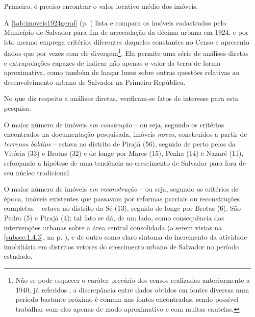 Primeiro, é preciso encontrar o valor locativo médio dos imóveis. 

A \autoref{tab:imoveis1924geral} (p. \pageref{tab:imoveis1924geral}) lista e compara os imóveis cadastrados pelo Município de Salvador para fim de arrecadação da décima urbana em 1924, e por isto mesmo emprega critérios diferentes daqueles constantes no Censo e apresenta dados que por vezes com ele divergem\footnote{Não se pode esquecer o caráter precário dos censos realizados anteriormente a 1940, já referidos \cite{oliveirasimoes_censos_2005, reisetal_areascensos_2011}; a discrepância entre dados obtidos em fontes diversas num período bastante próximo é comum nas fontes encontradas, sendo possível trabalhar com eles apenas de modo aproximativo e com muitas cautelas.}. Ela permite uma série de análises diretas e extrapolações capazes de indicar não apenas o valor da terra de forma aproximativa, como também de lançar luzes sobre outras questões relativas ao desenvolvimento urbano de Salvador na Primeira República.



No que diz respeito a análises diretas, verificam-se fatos de interesse para esta pesquisa.

O maior número de imóveis \textit{em construção} -- ou seja, segundo os critérios encontrados na documentação pesquisada, imóveis \textit{novos}, construídos a partir de \textit{terrenos baldios} -- estava no distrito de Pirajá (56), seguido de perto pelos da Vitória (33) e Brotas (32) e de longe por Mares (15), Penha (14) e Nazaré (11), reforçando a hipótese de uma tendência ao crescimento de Salvador para fora de seu núcleo tradicional.

O maior número de imóveis \textit{em reconstrução} -- ou seja, segundo os critérios de época, imóveis existentes que passavam por reformas parciais ou reconstruções completas -- estava no distrito da Sé (13), seguido de longe por Brotas (6), São Pedro (5) e Pirajá (4); tal fato se dá, de um lado, como consequência das intervenções urbanas sobre a área central consolidada (a serem vistas na \autoref{subsec:1.4.3}, na p. \pageref{subsec:1.4.3}), e de outro como claro sintoma do incremento da atividade imobiliária em distritos vetores do crescimento urbano de Salvador no período estudado.

